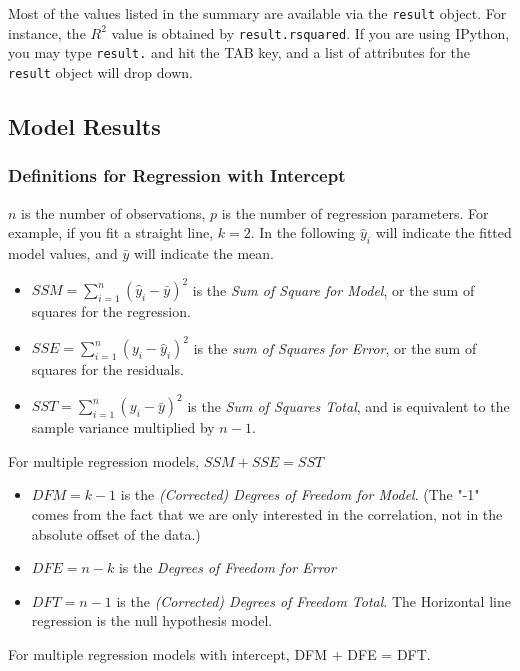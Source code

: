 Most of the values listed in the summary are available via the \lstinline{result} object. For instance, the $R^2$ value is obtained by \lstinline{result.rsquared}. If you are using IPython, you may type \lstinline{result.} and hit the TAB key, and a list of attributes for the \lstinline{result} object will drop down.

\subsection{Model Results}
\subsubsection{Definitions for Regression with Intercept}

$n$ is the number of observations, $p$ is the number of regression parameters. For example, if you fit a straight line, $k=2$.
In the following $\hat{y}_i$ will indicate the fitted model values, and $\bar{y}$ will indicate the mean.

\begin{itemize}
  \item $SSM = \sum_{i=1}^n (\hat{y}_i-\bar{y})^2$ is the \emph{Sum of Square for Model}, or the sum of squares for the regression.
  \item $SSE = \sum_{i=1}^n (y_i-\hat{y}_i)^2$ is the \emph{sum of Squares for Error}, or the sum of squares for the residuals.
  \item $SST = \sum_{i=1}^n (y_i-\bar{y})^2$ is the \emph{Sum of Squares Total}, and is equivalent to the sample variance multiplied by $n-1$.
\end{itemize}

For multiple regression models, $SSM + SSE = SST$

\begin{itemize}
  \item $DFM = k - 1$ is the \emph{(Corrected) Degrees of Freedom for Model}. (The "-1" comes from the fact that we are only interested in the correlation, not in the absolute offset of the data.)
  \item $DFE = n - k$ is the \emph{Degrees of Freedom for Error}
  \item $DFT = n - 1$ is the \emph{(Corrected) Degrees of Freedom Total}. The Horizontal line regression is the null hypothesis model.
\end{itemize}

For multiple regression models with intercept, DFM + DFE = DFT.

